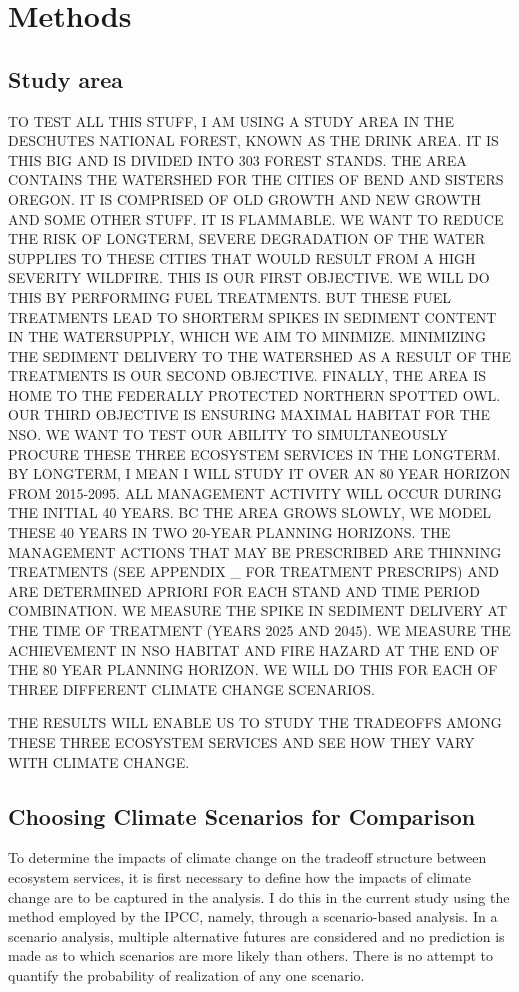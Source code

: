 \section{Methods}
\subsection{Study area}
TO TEST ALL THIS STUFF, I AM USING A STUDY AREA IN THE DESCHUTES NATIONAL FOREST, KNOWN AS THE DRINK AREA. IT IS THIS BIG AND IS DIVIDED INTO 303 FOREST STANDS. THE AREA CONTAINS THE WATERSHED FOR THE CITIES OF BEND AND SISTERS OREGON. IT IS COMPRISED OF OLD GROWTH AND NEW GROWTH AND SOME OTHER STUFF. IT IS FLAMMABLE. WE WANT TO REDUCE THE RISK OF LONGTERM, SEVERE DEGRADATION OF THE WATER SUPPLIES TO THESE CITIES THAT WOULD RESULT FROM A HIGH SEVERITY WILDFIRE. THIS IS OUR FIRST OBJECTIVE. WE WILL DO THIS BY PERFORMING FUEL TREATMENTS. BUT THESE FUEL TREATMENTS LEAD TO SHORTERM SPIKES IN SEDIMENT CONTENT IN THE WATERSUPPLY, WHICH WE AIM TO MINIMIZE. MINIMIZING THE SEDIMENT DELIVERY TO THE WATERSHED AS A RESULT OF THE TREATMENTS IS OUR SECOND OBJECTIVE. FINALLY, THE AREA IS HOME TO THE FEDERALLY PROTECTED NORTHERN SPOTTED OWL. OUR THIRD OBJECTIVE IS ENSURING MAXIMAL HABITAT FOR THE NSO. WE WANT TO TEST OUR ABILITY TO SIMULTANEOUSLY PROCURE THESE THREE ECOSYSTEM SERVICES IN THE LONGTERM. BY LONGTERM, I MEAN I WILL STUDY IT OVER AN 80 YEAR HORIZON FROM 2015-2095. ALL MANAGEMENT ACTIVITY WILL OCCUR DURING THE INITIAL 40 YEARS. BC THE AREA GROWS SLOWLY, WE MODEL THESE 40 YEARS IN TWO 20-YEAR PLANNING HORIZONS. THE MANAGEMENT ACTIONS THAT MAY BE PRESCRIBED ARE THINNING TREATMENTS (SEE APPENDIX \_ FOR TREATMENT PRESCRIPS) AND ARE DETERMINED APRIORI FOR EACH STAND AND TIME PERIOD COMBINATION. WE MEASURE THE SPIKE IN SEDIMENT DELIVERY AT THE TIME OF TREATMENT (YEARS 2025 AND 2045). WE MEASURE THE ACHIEVEMENT IN NSO HABITAT AND FIRE HAZARD AT THE END OF THE 80 YEAR PLANNING HORIZON. WE WILL DO THIS FOR EACH OF THREE DIFFERENT CLIMATE CHANGE SCENARIOS.

THE RESULTS WILL ENABLE US TO STUDY THE TRADEOFFS AMONG THESE THREE ECOSYSTEM SERVICES AND SEE HOW THEY VARY WITH CLIMATE CHANGE.

\subsection{Choosing Climate Scenarios for Comparison}
To determine the impacts of climate change on the tradeoff structure between ecosystem services, it is first necessary to define how the impacts of climate change are to be captured in the analysis. I do this in the current study using the method employed by the IPCC, namely, through a scenario-based analysis. In a scenario analysis, multiple alternative futures are considered and no prediction is made as to which scenarios are more likely than others. There is no attempt to quantify the probability of realization of any one scenario.

